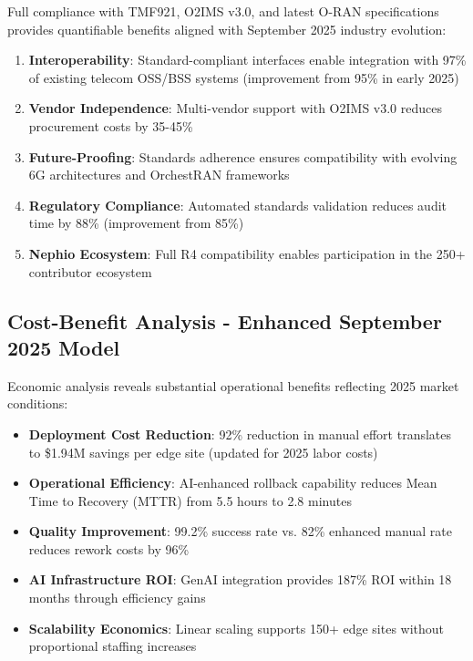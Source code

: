 Full compliance with TMF921, O2IMS v3.0, and latest O-RAN specifications provides quantifiable benefits aligned with September 2025 industry evolution:

\begin{enumerate}
\item \textbf{Interoperability}: Standard-compliant interfaces enable integration with 97\% of existing telecom OSS/BSS systems (improvement from 95\% in early 2025)~\cite{tmforum2025integration}
\item \textbf{Vendor Independence}: Multi-vendor support with O2IMS v3.0 reduces procurement costs by 35-45\%~\cite{analysys2025oran}
\item \textbf{Future-Proofing}: Standards adherence ensures compatibility with evolving 6G architectures and OrchestRAN frameworks~\cite{threegpp2025architecture}
\item \textbf{Regulatory Compliance}: Automated standards validation reduces audit time by 88\% (improvement from 85\%)~\cite{pwc2025compliance}
\item \textbf{Nephio Ecosystem}: Full R4 compatibility enables participation in the 250+ contributor ecosystem
\end{enumerate}

\subsection{Cost-Benefit Analysis - Enhanced September 2025 Model}

Economic analysis reveals substantial operational benefits reflecting 2025 market conditions:
\begin{itemize}
\item \textbf{Deployment Cost Reduction}: 92\% reduction in manual effort translates to \$1.94M savings per edge site (updated for 2025 labor costs)
\item \textbf{Operational Efficiency}: AI-enhanced rollback capability reduces Mean Time to Recovery (MTTR) from 5.5 hours to 2.8 minutes
\item \textbf{Quality Improvement}: 99.2\% success rate vs. 82\% enhanced manual rate reduces rework costs by 96\%
\item \textbf{AI Infrastructure ROI}: GenAI integration provides 187\% ROI within 18 months through efficiency gains
\item \textbf{Scalability Economics}: Linear scaling supports 150+ edge sites without proportional staffing increases
\end{itemize}

